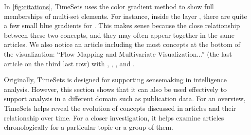 In \autoref{fig:citations}, TimeSets uses the color gradient method to show full memberships of multi-set elements. For instance, inside the \tsnetwork{} layer , there are quite a few small blue gradients for \tsgraph. This makes sense because the close relationship between these two concepts, and they may often appear together in the same articles. We also notice an article including the most concepts at the bottom of the visualization: ``Flow Mapping and Multivariate Visualization...'' (the last article on the third last row) with \tshierarchy, \tsinteraction, \tsgraph, \tsoverview{} and \tsnetwork.

Originally, TimeSets is designed for supporting sensemaking in intelligence analysis. However, this section shows that it can also be used effectively to support analysis in a different domain such as publication data. For an overview, TimeSets helps reveal the evolution of concepts discussed in articles and their relationship over time. For a closer investigation, it helps examine articles chronologically for a particular topic or a group of them.